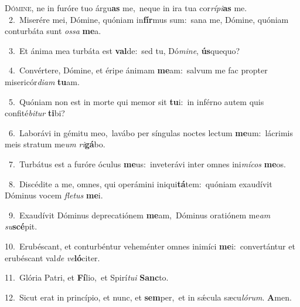 \lettrine{\initial\textcolor{\initialcolor}{D}}{ómine,} ne in furóre tuo árgu\textbf{as} me,~\star neque in ira tua cor\-\textit{rí}\-\textit{pi}\textbf{as} me.\\
{\numbfont\textcolor{\numbcolor}{~2.}}~Miserére mei, Dómine, quóniam in\-\textbf{fír}\-mus sum:~\star sana me, Dómine, quóniam conturbáta sunt \textit{os}\-\textit{sa} \textbf{me}\-a.\par
{\numbfont\textcolor{\numbcolor}{~3.}}~Et ánima mea turbáta est \textbf{val}\-de:~\star sed tu, Dó\-\textit{mi}\-\textit{ne}, \textbf{ús}\-quequo?\par
{\numbfont\textcolor{\numbcolor}{~4.}}~Convértere, Dómine, et éripe ánimam \textbf{me}\-am:~\star salvum me fac propter misericór\-\textit{di}\-\textit{am} \textbf{tu}\-am.\par
{\numbfont\textcolor{\numbcolor}{~5.}}~Quóniam non est in morte qui memor sit \textbf{tu}\-i:~\star in inférno autem quis confité\-\textit{bi}\-\textit{tur} \textbf{ti}\-bi?\par
{\numbfont\textcolor{\numbcolor}{~6.}}~Laborávi in gémitu meo,~\dagger lavábo per síngulas noctes lectum \textbf{me}\-um:~\star lácrimis meis stratum me\textit{um} \textit{ri}\-\textbf{gá}bo.\par
{\numbfont\textcolor{\numbcolor}{~7.}}~Turbátus est a furóre óculus \textbf{me}\-us:~\star inveterávi inter omnes ini\-\textit{mí}\-\textit{cos} \textbf{me}\-os.\par
{\numbfont\textcolor{\numbcolor}{~8.}}~Discédite a me, omnes, qui operámini iniqui\-\textbf{tá}\-tem:~\star quóniam exaudívit Dóminus vocem \textit{fle}\-\textit{tus} \textbf{me}\-i.\par
{\numbfont\textcolor{\numbcolor}{~9.}}~Exaudívit Dóminus deprecatiónem \textbf{me}\-am,~\star Dóminus oratiónem me\textit{am} \textit{su}\-\textbf{scé}pit.\par
{\numbfont\textcolor{\numbcolor}{10.}}~Erubéscant, et conturbéntur veheménter omnes inimíci \textbf{me}\-i:~\star convertántur et erubéscant val\textit{de} \textit{ve}\-\textbf{ló}citer.\par
{\numbfont\textcolor{\numbcolor}{11.}}~Glória Patri, et \textbf{Fí}\-lio,~\star et Spirí\-\textit{tu}\-\textit{i} \textbf{Sanc}\-to.\par
{\numbfont\textcolor{\numbcolor}{12.}}~Sicut erat in princípio, et nunc, et \textbf{sem}\-per,~\star et in sǽcula sæcu\-\textit{ló}\-\textit{rum}. \textbf{A}\-men.\par
